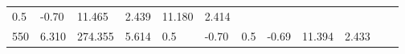 \documentclass{article}
\begin{document}
\begin{longtable}[]{@{}llllllllllll@{}}
\begin{minipage}[t]{0.03\columnwidth}
0.5\strut
\end{minipage} & \begin{minipage}[t]{0.06\columnwidth}\raggedright\strut
-0.70\strut
\end{minipage} & \begin{minipage}[t]{0.06\columnwidth}\raggedright\strut
11.465\strut
\end{minipage} & \begin{minipage}[t]{0.08\columnwidth}\raggedright\strut
2.439\strut
\end{minipage} & \begin{minipage}[t]{0.06\columnwidth}\raggedright\strut
11.180\strut
\end{minipage} & \begin{minipage}[t]{0.09\columnwidth}\raggedright\strut
2.414\strut
\end{minipage}\tabularnewline
\begin{minipage}[t]{0.03\columnwidth}\raggedright\strut
550\strut
\end{minipage} & \begin{minipage}[t]{0.06\columnwidth}\raggedright\strut
6.310\strut
\end{minipage} & \begin{minipage}[t]{0.06\columnwidth}\raggedright\strut
274.355\strut
\end{minipage} & \begin{minipage}[t]{0.08\columnwidth}\raggedright\strut
5.614\strut
\end{minipage} & \begin{minipage}[t]{0.03\columnwidth}\raggedright\strut
0.5\strut
\end{minipage} & \begin{minipage}[t]{0.06\columnwidth}\raggedright\strut
-0.70\strut
\end{minipage} & \begin{minipage}[t]{0.03\columnwidth}\raggedright\strut
0.5\strut
\end{minipage} & \begin{minipage}[t]{0.06\columnwidth}\raggedright\strut
-0.69\strut
\end{minipage} & \begin{minipage}[t]{0.06\columnwidth}\raggedright\strut
11.394\strut
\end{minipage} & \begin{minipage}[t]{0.08\columnwidth}\raggedright\strut
2.433\strut
\end{minipage} & \begin{minipage}[t]{0.06\columnwidth}\raggedright\strut

\end{minipage}
\end{longtable}
\end{document}
